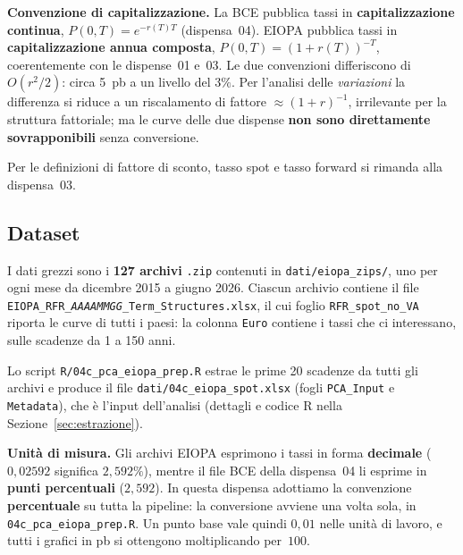 \documentclass[11pt,a4paper]{article}
\theoremstyle{plain}
\theoremstyle{definition}
\theoremstyle{remark}
\begin{document}
\begin{warningbox}
\textbf{Convenzione di capitalizzazione.}
La BCE pubblica tassi in \textbf{capitalizzazione continua},
$P(0,T)=e^{-r(T)T}$ (dispensa~04). EIOPA pubblica tassi in
\textbf{capitalizzazione annua composta}, $P(0,T)=(1+r(T))^{-T}$,
coerentemente con le dispense~01 e~03. Le due convenzioni differiscono di
$O(r^2/2)$: circa 5~pb a un livello del $3\%$. Per l'analisi delle
\emph{variazioni} la differenza si riduce a un riscalamento di fattore
$\approx(1+r)^{-1}$, irrilevante per la struttura fattoriale; ma le curve
delle due dispense \textbf{non sono direttamente sovrapponibili} senza
conversione.
\end{warningbox}

\noindent Per le definizioni di fattore di sconto, tasso spot e tasso forward si
rimanda alla dispensa~03.

\subsection{Dataset}

I dati grezzi sono i \textbf{127 archivi} \texttt{.zip} contenuti in
\texttt{dati/eiopa\_zips/}, uno per ogni mese da dicembre 2015 a giugno 2026.
Ciascun archivio contiene il file
\texttt{EIOPA\_RFR\_\textit{AAAAMMGG}\_Term\_Structures.xlsx}, il cui foglio
\texttt{RFR\_spot\_no\_VA} riporta le curve di tutti i paesi: la colonna
\texttt{Euro} contiene i tassi che ci interessano, sulle scadenze da 1 a 150
anni.

Lo script \texttt{R/04c\_pca\_eiopa\_prep.R} estrae le prime 20 scadenze da tutti
gli archivi e produce il file \texttt{dati/04c\_eiopa\_spot.xlsx}
(fogli \texttt{PCA\_Input} e \texttt{Metadata}), che \`e l'input dell'analisi
(dettagli e codice R nella Sezione~\ref{sec:estrazione}).

\begin{warningbox}
\textbf{Unit\`a di misura.}
Gli archivi EIOPA esprimono i tassi in forma \textbf{decimale}
($0{,}02592$ significa $2{,}592\%$), mentre il file BCE della dispensa~04 li
esprime in \textbf{punti percentuali} ($2{,}592$). In questa dispensa adottiamo
la convenzione \textbf{percentuale} su tutta la pipeline: la conversione avviene
una volta sola, in \texttt{04c\_pca\_eiopa\_prep.R}. Un punto base vale quindi
$0{,}01$ nelle unit\`a di lavoro, e tutti i grafici in pb si ottengono
moltiplicando per~$100$.
\end{warningbox}

\end{document}

